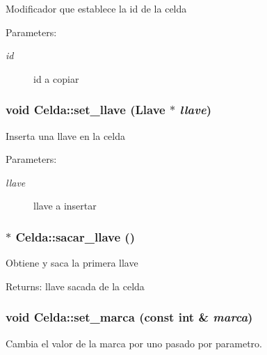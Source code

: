 Modificador que establece la id de la celda \begin{Desc}
\item[Parameters:]
\begin{description}
\item[{\em id}]id a copiar \end{description}
\end{Desc}
\subsubsection{\setlength{\rightskip}{0pt plus 5cm}void Celda::set\_\-llave ({\bf Llave} $\ast$ {\em llave})}\label{classCelda_85495f01557a7c1762619208501a0cb8}


Inserta una llave en la celda \begin{Desc}
\item[Parameters:]
\begin{description}
\item[{\em llave}]llave a insertar \end{description}
\end{Desc}
\subsubsection{ $\ast$ Celda::sacar\_\-llave ()}\label{classCelda_65bb99ee45297f1e63326d073ce07593}


Obtiene y saca la primera llave \begin{Desc}
\item[Returns:]llave sacada de la celda \end{Desc}
\subsubsection{\setlength{\rightskip}{0pt plus 5cm}void Celda::set\_\-marca (const int \& {\em marca})\hspace{0.3cm}{\tt  [inline]}}\label{classCelda_7cd701245d716ad4ee0c6f23a1e7eeac}


Cambia el valor de la marca por uno pasado por parametro. 

